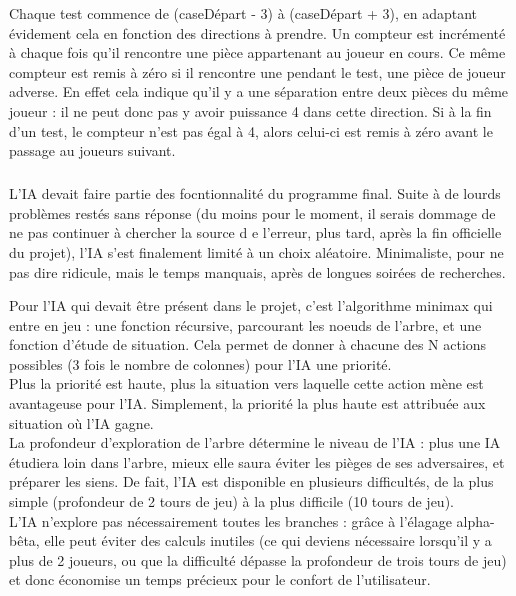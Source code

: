 \documentclass{report}
\begin{document}
	Chaque test commence de (caseDépart - 3) à (caseDépart + 3), en adaptant évidement cela en fonction des directions à prendre. Un compteur est incrémenté à chaque fois qu'il rencontre une pièce appartenant au joueur en cours. Ce même compteur est remis à zéro si il rencontre une pendant le test, une pièce de joueur adverse. En effet cela indique qu'il y a une séparation entre deux pièces du même joueur : il ne peut donc pas y avoir puissance 4 dans cette direction. 
	Si à la fin d'un test, le compteur n'est pas égal à 4, alors celui-ci est remis à zéro avant le passage au joueurs suivant.\\

        \subparagraph*{} %
        L'IA devait faire partie des focntionnalité du programme final. Suite à de lourds problèmes restés sans réponse (du moins pour le moment, il serais dommage de ne pas continuer 
            à chercher la source d e l'erreur, plus tard, après la fin officielle du projet), l'IA s'est finalement limité à un choix aléatoire. Minimaliste, pour ne pas dire ridicule,
            mais le temps manquais, après de longues soirées de recherches.

        Pour l'IA qui devait être présent dans le projet, c'est l'algorithme minimax qui entre en jeu : une fonction récursive, parcourant les noeuds de l'arbre, 
            et une fonction d'étude de situation. 
        Cela permet de donner à chacune des N actions possibles (3 fois le nombre de colonnes) pour l'IA une priorité. \\
        Plus la priorité est haute, plus la situation vers laquelle cette action mène est avantageuse pour l'IA. Simplement, la priorité la plus haute est attribuée aux situation où 
        l'IA gagne. \\
        La profondeur d'exploration de l'arbre détermine le niveau de l'IA : plus une IA étudiera loin dans l'arbre, mieux elle saura éviter les pièges de ses adversaires, et préparer
        les siens. De fait, l'IA est disponible en plusieurs difficultés, de la plus simple (profondeur de 2 tours de jeu) à la plus difficile (10 tours de jeu). \\
        L'IA n'explore pas nécessairement toutes les branches : grâce à l'élagage alpha-bêta, elle peut éviter des calculs inutiles (ce qui deviens nécessaire lorsqu'il y a plus 
        de 2 joueurs, ou que la difficulté dépasse la profondeur de trois tours de jeu) et donc économise un temps précieux pour le confort de l'utilisateur.\\
\end{document}
